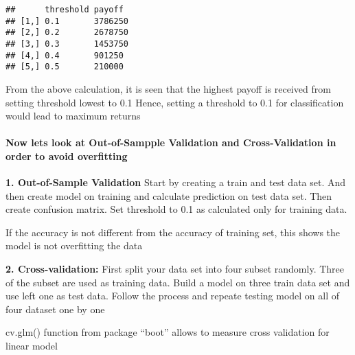 \documentclass[
]{article}
\begin{document}
\begin{verbatim}
##      threshold payoff 
## [1,] 0.1       3786250
## [2,] 0.2       2678750
## [3,] 0.3       1453750
## [4,] 0.4       901250 
## [5,] 0.5       210000
\end{verbatim}

From the above calculation, it is seen that the highest payoff is
received from setting threshold lowest to 0.1 Hence, setting a threshold
to 0.1 for classification would lead to maximum returns

\hypertarget{now-lets-look-at-out-of-sampple-validation-and-cross-validation-in-order-to-avoid-overfitting}{%
\paragraph{Now lets look at Out-of-Sampple Validation and
Cross-Validation in order to avoid
overfitting}\label{now-lets-look-at-out-of-sampple-validation-and-cross-validation-in-order-to-avoid-overfitting}}

\textbf{1. Out-of-Sample Validation} Start by creating a train and test
data set. And then create model on training and calculate prediction on
test data set. Then create confusion matrix. Set threshold to 0.1 as
calculated only for training data.

If the accuracy is not different from the accuracy of training set, this
shows the model is not overfitting the data

\textbf{2. Cross-validation:} First split your data set into four subset
randomly. Three of the subset are used as training data. Build a model
on three train data set and use left one as test data. Follow the
process and repeate testing model on all of four dataset one by one

cv.glm() function from package ``boot'' allows to measure cross
validation for linear model
\end{document}
